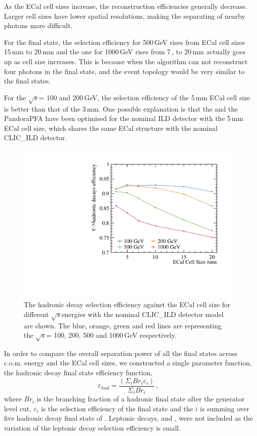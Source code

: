 \documentclass[a4paper,11pt]{article}
\newcommand{\decayElectron}{\Pem\PAGne\PGnGt}
\newcommand{\decayMuon}{\PGmm\PAGnGm\PGnGt}
\newcommand{\decayRho}{\PGrP{\PGpm\PGpz}\PGnGt}
\newcommand{\decayAiPhoton}{\PaDoP{\PGpm\PGpz\PGpz}\PGnGt}
\newcommand{\rootS}{\ensuremath{\sqrt{s}}}
\begin{document}
As the ECal cell sizes increase, the reconstruction efficiencies generally decrease. Larger cell sizes have lower spatial resolutions, making the separating of nearby photons more difficult.

For the \decayAiPhoton final state, the selection efficiency for 500\,GeV rises from ECal cell sizes 15\,mm to 20\,mm and the one for 1000\,GeV rises from 7\,, to 20\,mm actually goes up as cell size increases. This is because when the algorithm can not reconstruct four photons in the \decayAiPhoton final state, and the event topology would be very similar to the \decayRho final states. 

For the \rootS = 100 and 200\,GeV, the selection efficiency of the 5\,mm ECal cell size is better than that of the 3\,mm. One possible explanation is that the  and the PandoraPFA have been optimised for the nominal ILD detector with the 5\,mm ECal cell size, which shares the same ECal structure with the nominal CLIC\_ILD detector.

\begin{figure}[htbp]
\centering %
\includegraphics[width=.45\textwidth]{plots/hadronicEff}
\caption{\label{fig:hadronic_efficiency} The \PGt hadronic decay selection efficiency against the ECal cell size for different \rootS energies with the nominal CLIC\_ILD detector model are shown. The blue, orange, green and red lines are representing the \rootS = 100, 200, 500 and 1000\,GeV respectively.}
\end{figure}

In order to compare the overall separation power of all the final states across c.o.m. energy and the ECal cell sizes, we constructed a single parameter function, the  \PGt hadronic decay final state efficiency function, 
\begin{equation}
\label{eq:had}
\varepsilon_{had} = \frac{\left(\Sigma_{i} {Br}_{i}\varepsilon_{i}\right)}{\Sigma_{i} {Br}_{i}}  \,,
\end{equation}
where $Br_{i}$ is the branching fraction of a hadronic final state after the generator level cut, $\varepsilon_{i}$ is the selection efficiency of the final state and the $i$ is summing over five hadronic decay final state of \PGt. Leptonic decays, \decayElectron and \decayMuon, were not included as the variation of the leptonic decay selection efficiency is small.
\end{document}
